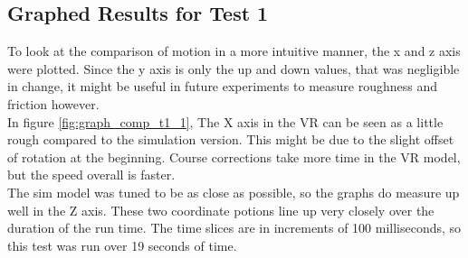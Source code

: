 \documentclass[10pt,a4paper]{article}
\begin{document}
	\subsection*{Graphed Results for Test 1}
	To look at the comparison of motion in a more intuitive manner, the x and z axis were plotted. Since the y axis is only the up and down values, that was negligible in change, it might be useful in future experiments to measure roughness and friction however.
	\\
	In figure \ref{fig:graph_comp_t1_1}, The X axis in the VR can be seen as a little rough compared to the simulation version. This might be due to the slight offset of rotation at the beginning. Course corrections take more time in the VR model, but the speed overall is faster. 
	\\
	The sim model was tuned to be as close as possible, so the graphs do measure up well in the Z axis. These two coordinate potions line up very closely over the duration of the run time. The time slices are in increments of 100 milliseconds, so this test was run over 19 seconds of time.
	
\end{document}
